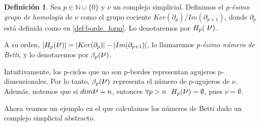 \documentclass[12pt, a4paper]{article}
\numberwithin{equation}{section}
\theoremstyle{definition}
\newtheorem{defi}{Definición}
\theoremstyle{remark}
\theoremstyle{plain}
\begin{document}
	\begin{defi}
		\label{defi:homology}
		Sea $p \in \mathbb{N}\cup\{0\}$ y {\Large $\nu$} un complejo 
		simplicial. Definimos el \textit{p-ésimo grupo de homología} 
		de {\Large $\nu$} como el grupo cociente $Ker(\partial_{p})/
		Im(\partial_{p+1})$, donde $\partial_{p}$ está definida como
		en \ref{def:borde_form}. Lo denotaremos por $H_{p}(\text{
		{\Large $\nu$}})$.

		A su orden, $|H_{p}(\text{{\Large $\nu$}})|=
		|Ker(\partial_{p})|-|Im(\partial_{p+1})|$, lo 
		llamaremos \textit{p-ésimo número de Betti}, y lo denotaremos
		por $\beta_{p}(\text{{\Large $\nu$}})$.
	\end{defi}

	Intuitivamente, los p-ciclos que no son p-bordes representan agujeros
	p-dimensionales. Por lo tanto, $\beta_{p}(\text{{\Large $\nu$}})$ 
	representa el número de p-agujeros de {\Large $\nu$}. Además, notemos 
	que si $dim\text{{\Large $\nu$}}=n$, entonces $\forall p >n 
	\hspace{0.25cm} H_{p}(\text{{\Large $\nu$}})=\emptyset$, pues {\Large 
	$\nu$}$=\emptyset$.

	Ahora veamos un ejemplo en el que calculamos los números de Betti dado 
	un complejo simplicial abstracto.
\end{document}
